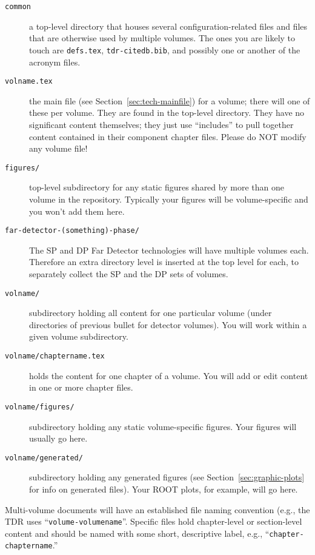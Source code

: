 \begin{description}
\item[\texttt{common}] a top-level directory that houses several configuration-related files and files that are otherwise used by multiple volumes. The ones you are likely to touch are \texttt{defs.tex}, \texttt{tdr-citedb.bib}, and possibly one or another of the acronym files.
\item[\texttt{volname.tex}] the main file (see Section~\ref{sec:tech-mainfile}) for a volume; there will one of these per volume. They are found in the top-level
  directory. They have no significant content themselves; they just use
  ``includes'' to pull together content contained in their component chapter files. Please do NOT modify any volume file!
\item[\texttt{figures/}] top-level subdirectory for any static figures
  shared by more than one volume in the repository. Typically your figures will be volume-specific and you won't add them here.
\item[\texttt{far-detector-(something)-phase/}] The SP and DP Far Detector technologies will have multiple volumes each. Therefore an extra directory level is inserted at the top level for each, to separately collect the SP and the DP sets of volumes.  
\item[\texttt{volname/}] subdirectory holding all content for one particular volume (under directories of previous bullet for detector volumes). You will work within a given volume subdirectory. 
\item[\texttt{volname/chaptername.tex}] holds the content for one chapter of a volume. You will add or edit content in one or more chapter files.
\item[\texttt{volname/figures/}] subdirectory holding any static volume-specific figures. Your figures will usually go here.
\item[\texttt{volname/generated/}] subdirectory holding any generated
  figures (see Section~\ref{sec:graphic-plots} for info on generated files). Your ROOT plots, for example, will go here.
\end{description}

Multi-volume documents will have an established file naming convention (e.g., the
TDR uses ``\texttt{volume-volumename}''.
Specific files hold chapter-level or section-level content and should be named with some
short, descriptive label, e.g., ``\texttt{chapter-chaptername}.''


